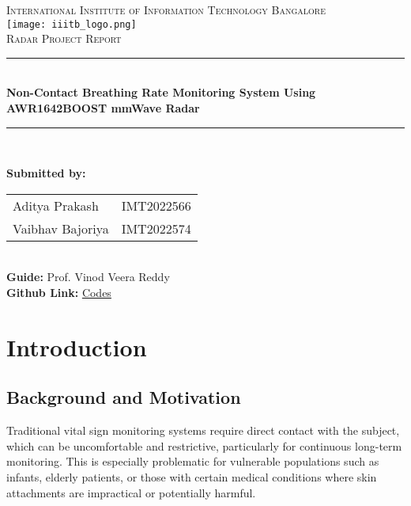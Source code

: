\documentclass[12pt]{article}
\begin{document}
\begin{titlepage}

\newcommand{\HRule}{\rule{\linewidth}{0.5mm}}

\centering

\textsc{\LARGE International Institute of Information Technology Bangalore}\\[1.5cm]

\texttt{[image: iiitb\_logo.png]}\\[1cm]

\textsc{\Large Radar Project Report}\\[0.5cm]

\HRule \\[0.5cm]
{\huge \bfseries Non-Contact Breathing Rate Monitoring System Using AWR1642BOOST mmWave Radar}\\[0.5cm]
\HRule \\[1cm]

\begin{flushleft}
\large
\textbf{Submitted by:}\\[0.4cm]
\begin{tabular}{@{}p{6.5cm} l}
Aditya Prakash & \textsc{IMT2022566} \\
Vaibhav Bajoriya & \textsc{IMT2022574} \\
\end{tabular}\\[0.5cm]

\textbf{Guide:} Prof. Vinod Veera Reddy\\
\textbf{Github Link:} \href{https://github.com/bajoriya-vaibhav/FMCW_Vital_Signal_Radar}{Codes}
\end{flushleft}

\end{titlepage}

\tableofcontents
\newpage

\section{Introduction}

\subsection{Background and Motivation}
Traditional vital sign monitoring systems require direct contact with the subject, which can be uncomfortable and restrictive, particularly for continuous long-term monitoring. This is especially problematic for vulnerable populations such as infants, elderly patients, or those with certain medical conditions where skin attachments are impractical or potentially harmful.
\end{document}
